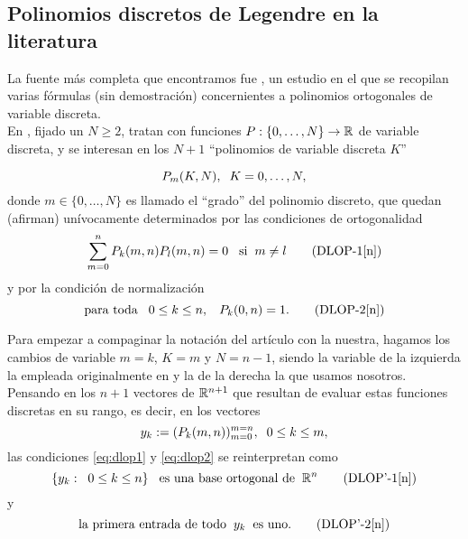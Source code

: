 \subsection{Polinomios discretos de Legendre en la literatura}
La fuente más completa que encontramos 
fue \cite{Neuman}, un estudio en el que se recopilan 
varias fórmulas (sin demostración) concernientes a polinomios
ortogonales de variable discreta. \\

En \cite{Neuman}, 
fijado un $N \geq 2$,
tratan con funciones $P : \{0, \ldots , N \} \rightarrow \mathbb{R}$
de variable discreta, y 
se interesan en los $N+1$ ``polinomios de variable
discreta $K$''

\[
P_{m}(K, N), \hspace{0.2cm} K=0, \ldots , N,
\]
donde $m \in \{0, \ldots, N \}$ es llamado el ``grado''
del polinomio discreto, que quedan (afirman)
unívocamente determinados por las condiciones
de ortogonalidad
\begin{equation}
\sum\limits_{m=0}^{n}P_{k}(m,n) P_{l}(m,n) =0
\hspace{0.3cm} \text{si} \hspace{0.2cm} m \neq l \tag{DLOP-1[n]} \label{eq:dlop1}
\end{equation}
y por la condición de normalización
\begin{equation}
\text{para toda} \hspace{0.3cm} 0 \leq k \leq n, \hspace{0.3cm} P_{k}(0, n)=1.   \tag{DLOP-2[n]} \label{eq:dlop2}
\end{equation}

Para empezar a compaginar la notación
del artículo con la nuestra, 
hagamos
los cambios de variable $m=k$, $K=m$
y $N=n-1$, siendo la variable de la izquierda la empleada
originalmente en
\cite{Neuman} y la de la derecha la que usamos nosotros. \\

Pensando en los 
$n+1$ vectores de $\mathbb{R}^{n+1}$ que resultan
de evaluar estas funciones discretas en su rango,
es decir, en los vectores
\begin{equation}
y_{k}:= (P_{k}(m, n))_{m=0}^{m=n}, \hspace{0.2cm}
0 \leq k \leq m,
\end{equation}
las condiciones \eqref{eq:dlop1} y \eqref{eq:dlop2}
se reinterpretan como
\begin{equation}
\{ y_{k}: \hspace{0.2cm} 0 \leq k \leq n\}
\hspace{0.3cm} \text{es una
base ortogonal de} \hspace{0.2cm} \mathbb{R}^{n}
\tag{DLOP'-1[n]} \label{eq:dlop'1}
\end{equation}
y 
\begin{equation}
\text{la primera
entrada de todo} \hspace{0.2cm} y_{k} \hspace{0.2cm}
\text{es uno.} 
\tag{DLOP'-2[n]} \label{eq:dlop'2}
\end{equation}


